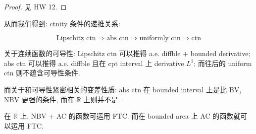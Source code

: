 \begin{proof}

见 HW 12.

\end{proof}

从而我们得到: ctnity 条件的递推关系:

\[\text{Lipschitz ctn}\Longrightarrow\text{abs ctn}\Longrightarrow\text{uniformly ctn}\Longrightarrow\text{ctn}\]

关于连续函数的可导性: Lipschitz ctn 可以推得 a.e. diffble \(+\) bounded derivative; abs ctn 可以推得 a.e. diffble 且在 cpt interval 上 derivative \(L^{1}\); 而往后的 uniform ctn 则不蕴含可导性条件.

而关于和可导性紧密相关的变差性质: abs ctn 在 bounded interval 上是比 BV, NBV 更强的条件, 而在 \(\mathbb{R}\) 上则并不是.

在 \(\mathbb{R}\) 上, NBV + AC 的函数可运用 FTC. 而在 bounded area 上 AC 的函数就可以运用 FTC.
